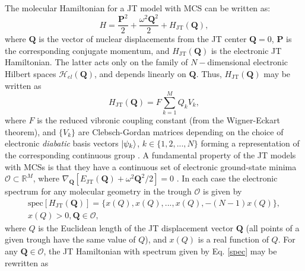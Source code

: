 \documentclass[superscriptaddress,showpacs,amsmath,amssymb,pra,twocolumn]{revtex4-1}
\begin{document}
The  molecular Hamiltonian for a JT model with MCS can be written as:
\begin{equation} H = \frac{\mathbf{P}^2}{2} + \frac{\omega^2 \mathbf{Q}^2}{2} + H_{\text{JT}}(\mathbf{Q}), \end{equation}
where $\mathbf{Q}$ is the vector of nuclear displacements from the JT center $\mathbf{Q}=0$, $\mathbf{P}$ is the corresponding conjugate momentum, and $H_{\text{JT}}(\mathbf{Q})$ is the electronic JT Hamiltonian. The latter acts only on the family of $N-$dimensional electronic Hilbert spaces $\mathcal{H}_{el}(\mathbf{Q})$, and depends linearly on $\mathbf{Q}$. Thus, $H_{\text{JT}}(\mathbf{Q})$ may be written as
\begin{equation} 
H_{\text{JT}}(\mathbf{Q}) = F \sum_{k=1}^M Q_k V_k,
\end{equation}
where $F$ is the reduced vibronic coupling constant (from the Wigner-Eckart theorem), and $\{V_k\}$ are Clebsch-Gordan matrices depending on the choice of electronic \textit{diabatic} basis vectors $\ket{\psi_{k}}$, $k\in\{1,2,...,N\}$ forming a representation of the corresponding continuous group \cite{pooler_continuous_1978, pooler_continuous_1980}.  
A fundamental property of the JT models with MCSs is that they have a
continuous set of electronic ground-state minima $\mathcal{O}\subset\mathbb{R}^{M}$, where $\nabla_\mathbf{Q} \left[E_{\text{JT}}(\mathbf{Q}) + \omega^2 \mathbf{Q}^2/2 \right] = 0$
\cite{ceulemans_a._structure_1987,pooler_continuous_1978,pooler_continuous_1980,ribeiro_continuous_2017}.
In each case the electronic spectrum for any molecular geometry in
the trough $\mathcal{O}$ is given by \cite{longuet-higgins_studies_1958,obrien_dynamic_1969-2,ceulemans_so4_1989,chancey1997jahn,ribeiro_continuous_2017}
\begin{align}
\text{spec}[H_{\text{JT}}(\mathbf{Q})]=\{x(Q),x(Q),...,x(Q),-(N-1)x(Q)\},\nonumber \\
x(Q)>0,\mathbf{Q}\in\mathcal{O},\label{spec}
\end{align}
where $Q$ is the Euclidean length of the JT displacement vector $\mathbf{Q}$ (all
points of a given trough have the same value of $Q$), and $x(Q)$ is a real function of $Q$. For any $\mathbf{Q}\in\mathcal{O}$,
the JT Hamiltonian with spectrum given by Eq. \ref{spec}
may be rewritten as \cite{ribeiro_continuous_2017}
\end{document}
